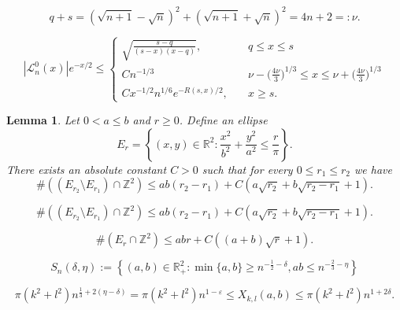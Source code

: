 \documentclass[10pt,a4paper]{amsart}
\newtheorem{lemma}{Lemma}
\newcommand{\R}{{\mathbb R}}
\newcommand{\Z}{{\mathbb Z}}
\begin{document}
\begin{equation}\label{eq:q+s=nu}
    q + s = (\sqrt{n+1}-\sqrt{n})^2 + (\sqrt{n+1}+\sqrt{n})^2 = 4n+2 =: \nu.
\end{equation}

\begin{equation}\label{eq:estimate}
    |\mathcal{L}^{0}_n(x)|e^{-x/2}\leq \begin{cases}
        \sqrt{\frac{s-q}{(s-x)(x-q)}}, &\quad  q\leq x\leq s\\
        C n^{-1/3} &\quad  \nu -\big(\tfrac{4\nu}{3}\big)^{1/3} \leq x\leq \nu +\big(\tfrac{4\nu}{3}\big)^{1/3} \\
        C x^{-1/2} n^{1/6} e^{-R(s,x)/2}, &\quad  x\geq s.
    \end{cases}
\end{equation}

\begin{lemma}\label{lem:ellipse_lattice_count}
Let $0< a \leq b$ and $r\geq0$. Define an ellipse
    \begin{equation}
        E_r = \left \{(x,y)\in \R^2 :\frac{x^2}{b^2}+\frac{y^2}{a^2}\leq \frac{r}{\pi} \right \}.
    \end{equation}
There exists an absolute constant $C>0$ such that for every $0 \leq r_1 \leq r_2$ we have
\begin{equation}\label{eq:ellipse_difference}
     \#\left(( E_{r_2} \setminus E_{r_1})\cap \Z^2 \right) \leq ab(r_2-r_1) + C(a\sqrt{r_2} + b \sqrt{r_2-r_1} + 1).
\end{equation}
\end{lemma}

\begin{equation}
     \#\left(( E_{r_2} \setminus E_{r_1})\cap \Z^2 \right) \leq ab(r_2-r_1) + C(a\sqrt{r_2} + b \sqrt{r_2-r_1} + 1).
\end{equation}

\begin{equation}\label{eq:ellipse}
     \#\left( E_{r}\cap \Z^2 \right) \leq abr + C((a+b)\sqrt{r} + 1).
\end{equation}

    \begin{equation}\label{eq:diagonal_safety_region}
           S_n(\delta,\eta) := \left\{ (a,b) \in \R^2_+ : \min\{a,b\}\geq n^{-\frac12-\delta}, ab \leq n^{-\frac{2}{3}-\eta} \right\} 
        \end{equation}

    \begin{equation}\label{eq:X_uniform_bounds}
        \pi (k^2 + l^2) n^{\frac{1}{3}+2(\eta - \delta)} = \pi (k^2 + l^2) n^{1-\varepsilon}
        \leq X_{k,l}(a,b)
        \leq \pi (k^2 + l^2) n^{1+2\delta}.
    \end{equation}
\end{document}
